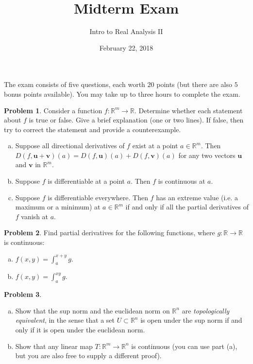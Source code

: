 \documentclass{amsart}
\newcommand{\+}[1]{\ensuremath{\mathbf{#1}}}
\newcommand{\R}{{\mathbb R}}
\theoremstyle{definition}
\newtheorem{prob}{Problem}
\begin{document}
\title{Midterm Exam}
\date{February 22, 2018}
\author{Intro to Real Analysis II}

\maketitle


The exam consists of five questions, each worth $20$ points (but there are also $5$ bonus points available).
You may take up to three hours to complete the exam.

\vspace{3mm}


\begin{prob}
Consider a function $f: \R^m \to \R$.
Determine whether each statement about $f$ is true or false.
Give a brief explanation (one or two lines).
If false, then try to correct the statement and provide a counterexample.
\begin{enumerate}[(a)]
 \item Suppose all directional derivatives of $f$ exist at a point $a \in \R^m$.
Then $D(f,\+u + \+v) (a) = D(f,\+u)(a) + D(f,\+v)(a)$ for any two vectors $\+u$ and $\+v$ in $\R^m$.
\item Suppose $f$ is differentiable at a point $a$.
Then $f$ is continuous at $a$.
\item Suppose $f$ is differentiable everywhere.  Then $f$ has an
extreme value (i.e. a maximum or a minimum) at $a \in \R^m$ if and only if
all the partial derivatives of $f$ vanish at $a$.
\end{enumerate}
\end{prob}

\vspace{3mm}


\begin{prob}
Find partial derivatives for the following functions,
where $g: \R \to \R$ is continuous:
\begin{enumerate}[(a)]
 \item $f(x,y) = \int^{x+y}_a g$.
 \item $f(x,y) = \int^{xy}_a g$.
\end{enumerate}
\end{prob}


\vspace{3mm}


\begin{prob}
\begin{enumerate}[(a)]
 \item Show that the sup norm and the euclidean norm 
 on $\R^n$ are \emph{topologically equivalent}, in the sense that
 a set $U \subset \R^n$ is open under the sup norm
 if and only if it is open under the euclidean norm.
 \item Show that any linear map $T: \R^m \to \R^n$
 is continuous (you can use part (a), but you are also free to 
 supply a different proof).
\end{enumerate}
\end{prob}
\end{document}
